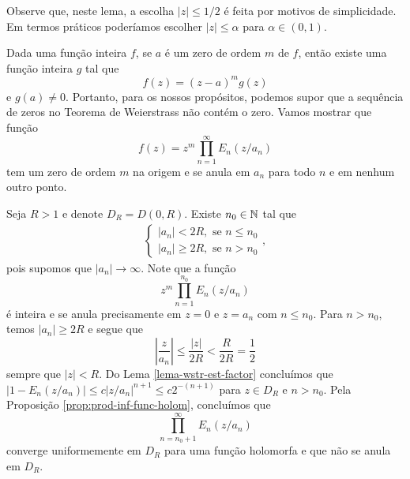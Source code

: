     Observe que, neste lema, a escolha $|z| \leq 1/2$ é 
    feita por motivos de simplicidade. Em termos práticos 
    poderíamos escolher $|z| \leq \alpha$ para $\alpha \in (0,1)$.
    
    Dada uma função inteira $f$, se $a$ é um zero de ordem 
    $m$ de $f$, então existe uma função inteira $g$ tal que
    \[ 
    f(z) = (z-a)^mg(z) 
    \]
    e $g(a) \neq 0$. Portanto, para os nossos propósitos, 
    podemos supor que a sequência de zeros no Teorema de 
    Weierstrass não contém o zero. Vamos mostrar que função 
    \[ 
    f(z) = z^m \prod_{n=1}^{\infty}E_n(z/a_n)
    \]
    tem um zero de ordem $m$ na  origem e se anula em $a_n$ 
    para todo $n$ e em nenhum outro ponto.
    
    Seja $R>1$ e denote $D_R = D(0,R)$. Existe $n_0 \in \mathbb{N}$ tal que 
    \begin{align*}
        \begin{cases}
            |a_n| < 2R, \text{ se } n \leq n_0 \\
            |a_n| \geq 2R, \text{ se } n > n_0
        \end{cases},
    \end{align*}
    pois supomos que $|a_n| \to \infty$. Note que a função 
    \[
    z^m\prod_{n=1}^{n_0}E_n(z/a_n)
    \]
    é inteira e se anula precisamente em $z = 0$ e $z = a_n$ com 
    $n \leq n_0$. Para $n > n_0$, temos $|a_n| \geq 2R$ e segue que
    \[
    \left | \frac{z}{a_n} \right | \leq \frac{|z|}{2R} < \frac{R}{2R} = \frac{1}{2}
    \]
    sempre que $|z| < R$. Do Lema \ref{lema-wstr-est-factor} 
    concluímos que 
    $|1 - E_n(z/a_n)| \leq c|z/a_n|^{n+1} \leq c2^{-(n+1)}$ 
    para $z \in D_R$ e $n > n_0$. 
    Pela Proposição \ref{prop:prod-inf-func-holom}, concluímos que 
    \[
    \prod_{n=n_0 + 1}^{\infty}E_n(z/a_n)
    \]
    converge uniformemente em $D_R$ para uma função holomorfa 
    e que não se anula em $D_R$.
    
